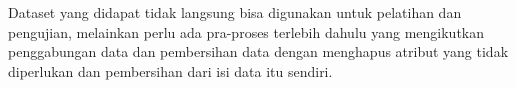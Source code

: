 Dataset yang didapat tidak langsung bisa digunakan untuk pelatihan dan
pengujian, melainkan perlu ada pra-proses terlebih dahulu yang mengikutkan
penggabungan data dan pembersihan data dengan menghapus atribut yang tidak
diperlukan dan pembersihan dari isi data itu sendiri.
